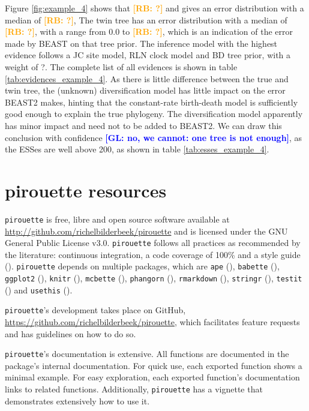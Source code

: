 \documentclass{article}
\newcommand{\giovanni}[1]{\textcolor{blue}{\textbf{[GL: #1]}}}
\newcommand{\richel}[1]{\textcolor{orange}{\textbf{[RB: #1]}}}
\begin{document}
Figure \ref{fig:example_4} shows that \richel{?}
and 
gives an error distribution with a median of \richel{?}, 
The twin tree has an error distribution with a median of \richel{?},
with a range from 0.0 to \richel{?}, which is an indication of the
error made by BEAST on that tree prior.
The inference model with the highest evidence follows a JC site model, 
RLN clock model and BD tree prior, with a weight of ?. 
The complete list of all evidences is shown in table \ref{tab:evidences_example_4}.
As there is little difference between the true and twin tree,
the (unknown) diversification model has little impact on the error
BEAST2 makes, hinting that the constant-rate birth-death model is
sufficiently good enough to explain the true phylogeny. 
The diversification model apparently has minor impact and need not to be
added to BEAST2.
We can draw this conclusion with confidence \giovanni{no, we cannot: one tree is not enough}, as the ESSes are well above 200, 
as shown in table \ref{tab:esses_example_4}.

\section{pirouette resources}

\verb;pirouette; is free, libre and open source software available at 
\url{http://github.com/richelbilderbeek/pirouette}
and is licensed under the GNU General Public License v3.0.
\verb;pirouette; follows all practices as recommended by the
literature: continuous integration, a code coverage of 100\%
and a style guide (\cite{style_guide}).
\verb;pirouette; depends on multiple packages, which are 
\verb;ape; (\cite{APE}), 
\verb;babette; (\cite{bilderbeek2018babette}),
\verb;ggplot2; (\cite{ggplot2}),
\verb;knitr; (\cite{knitr}),
\verb;mcbette; (\cite{mcbette}),
\verb;phangorn; (\cite{phangorn}),
\verb;rmarkdown; (\cite{rmarkdown}),
\verb;stringr; (\cite{stringr}),
\verb;testit; (\cite{testit}) and 
\verb;usethis; (\cite{usethis}).

\verb;pirouette;'s development takes place on GitHub,
\url{https://github.com/richelbilderbeek/pirouette}, 
which facilitates feature requests and 
has guidelines on how to do so.

\verb;pirouette;'s documentation is extensive. All functions are documented in the package's internal documentation. For quick use, 
each exported function shows a minimal example. 
For easy exploration, each exported function's documentation links to related functions.
Additionally, \verb;pirouette; has a vignette that demonstrates extensively how to use it. 
\end{document}
